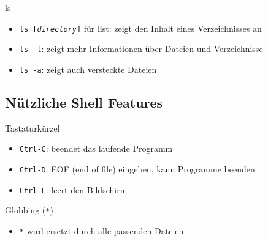 \begin{frame}{ls}
  \begin{itemize}
    \item \texttt{ls [\textit{directory}]} für list: zeigt den Inhalt eines Verzeichnisses an
    \item \texttt{ls -l}: zeigt mehr Informationen über Dateien und Verzeichnisse
    \item \texttt{ls -a}: zeigt auch versteckte Dateien
  \end{itemize}
\end{frame}

\subsection{Nützliche Shell Features}
\begin{frame}{Tastaturkürzel}
  \begin{itemize}
    \item \texttt{Ctrl-C}: beendet das laufende Programm
    \item \texttt{Ctrl-D}: EOF (end of file) eingeben, kann Programme beenden
    \item \texttt{Ctrl-L}: leert den Bildschirm
  \end{itemize}
\end{frame}

\begin{frame}{Globbing (\texttt{*})}
  \begin{itemize}
    \item \texttt{*} wird ersetzt durch alle passenden Dateien
  \end{itemize}
\end{frame}
